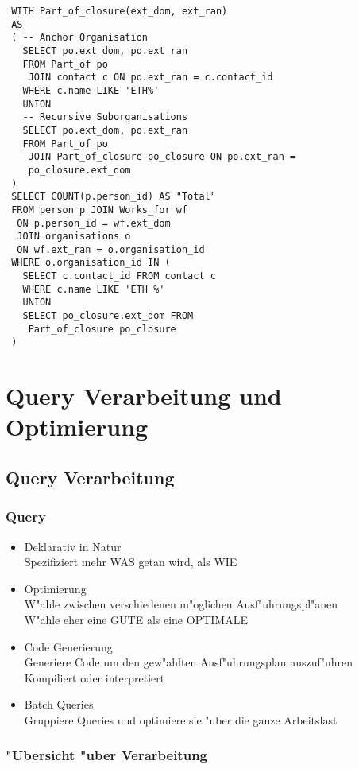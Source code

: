 \documentclass[german, 10pt, a4paper, twocolumn]{scrartcl}
\theoremstyle{definition}
\theoremstyle{remark}
\theoremstyle{example}
\begin{document}
\small
\begin{verbatim}
 WITH Part_of_closure(ext_dom, ext_ran)
 AS
 ( -- Anchor Organisation
   SELECT po.ext_dom, po.ext_ran
   FROM Part_of po
    JOIN contact c ON po.ext_ran = c.contact_id
   WHERE c.name LIKE 'ETH%'
   UNION
   -- Recursive Suborganisations
   SELECT po.ext_dom, po.ext_ran
   FROM Part_of po
    JOIN Part_of_closure po_closure ON po.ext_ran =
    po_closure.ext_dom
 )
 SELECT COUNT(p.person_id) AS "Total"
 FROM person p JOIN Works_for wf
  ON p.person_id = wf.ext_dom
  JOIN organisations o
  ON wf.ext_ran = o.organisation_id
 WHERE o.organisation_id IN (
   SELECT c.contact_id FROM contact c
   WHERE c.name LIKE 'ETH %'
   UNION
   SELECT po_closure.ext_dom FROM
    Part_of_closure po_closure
 )
\end{verbatim}
\normalsize

\section{Query Verarbeitung und Optimierung}

\subsection{Query Verarbeitung}

\subsubsection{Query}

\begin{itemize}
	\item Deklarativ in Natur\\
		Spezifiziert mehr WAS getan wird, als WIE
	\item Optimierung\\
		W"ahle zwischen verschiedenen m"oglichen Ausf"uhrungspl"anen\\
		W"ahle eher eine GUTE als eine OPTIMALE
	\item Code Generierung\\
		Generiere Code um den gew"ahlten Ausf"uhrungsplan auszuf"uhren\\
		Kompiliert oder interpretiert
	\item Batch Queries\\
		Gruppiere Queries und optimiere sie "uber die ganze Arbeitslast
\end{itemize}

\subsubsection{"Ubersicht "uber Verarbeitung}
\end{document}
